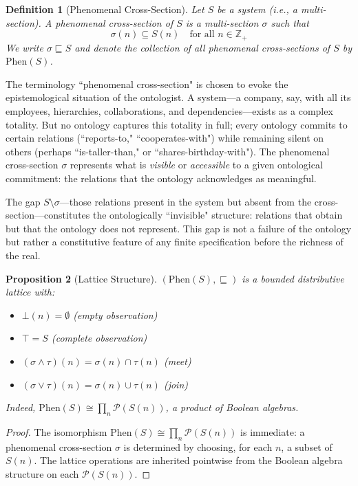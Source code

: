 \documentclass[12pt,a4paper]{article}
\newtheorem{definition}{Definition}[section]
\newtheorem{proposition}[definition]{Proposition}
\newcommand{\powerset}{\mathcal{P}}
\newcommand{\Phen}{\mathrm{Phen}}
\begin{document}
\begin{definition}[Phenomenal Cross-Section]
\label{def:phenom-cross-section}
Let $S$ be a system (i.e., a multi-section). A \emph{phenomenal cross-section} of $S$ is a multi-section $\sigma$ such that
$$
\sigma(n) \subseteq S(n) \quad \text{for all } n \in \mathbb{Z}_+
$$
We write $\sigma \sqsubseteq S$ and denote the collection of all phenomenal cross-sections of $S$ by $\Phen(S)$.
\end{definition}

The terminology ``phenomenal cross-section" is chosen to evoke the epistemological situation of the ontologist. A system---a company, say, with all its employees, hierarchies, collaborations, and dependencies---exists as a complex totality. But no ontology captures this totality in full; every ontology commits to certain relations (``reports-to," ``cooperates-with") while remaining silent on others (perhaps ``is-taller-than," or ``shares-birthday-with"). The phenomenal cross-section $\sigma$ represents what is \emph{visible} or \emph{accessible} to a given ontological commitment: the relations that the ontology acknowledges as meaningful.

The gap $S \setminus \sigma$---those relations present in the system but absent from the cross-section---constitutes the ontologically ``invisible" structure: relations that obtain but that the ontology does not represent. This gap is not a failure of the ontology but rather a constitutive feature of any finite specification before the richness of the real.

\begin{proposition}[Lattice Structure]
\label{prop:phen-lattice}
$(\Phen(S), \sqsubseteq)$ is a bounded distributive lattice with:
\begin{itemize}
    \item $\bot(n) = \emptyset$ \hfill (empty observation)
    \item $\top = S$ \hfill (complete observation)
    \item $(\sigma \wedge \tau)(n) = \sigma(n) \cap \tau(n)$ \hfill (meet)
    \item $(\sigma \vee \tau)(n) = \sigma(n) \cup \tau(n)$ \hfill (join)
\end{itemize}
Indeed, $\Phen(S) \cong \prod_{n} \powerset(S(n))$, a product of Boolean algebras.
\end{proposition}

\begin{proof}
The isomorphism $\Phen(S) \cong \prod_n \powerset(S(n))$ is immediate: a phenomenal cross-section $\sigma$ is determined by choosing, for each $n$, a subset of $S(n)$. The lattice operations are inherited pointwise from the Boolean algebra structure on each $\powerset(S(n))$.
\end{proof}
\end{document}
